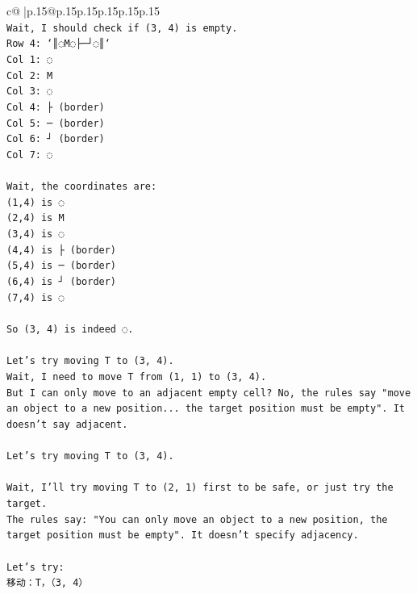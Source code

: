 \documentclass{article}
\begin{document}
{\begin{supertabular}{c@{$\;$}|p{.15\linewidth}@{}p{.15\linewidth}p{.15\linewidth}p{.15\linewidth}p{.15\linewidth}p{.15\linewidth}}
{{{\\ 
\texttt{Wait, I should check if (3, 4) is empty.} \\
\texttt{Row 4: `║◌M◌├─┘◌║`} \\
\texttt{Col 1: ◌} \\
\texttt{Col 2: M} \\
\texttt{Col 3: ◌} \\
\texttt{Col 4: ├ (border)} \\
\texttt{Col 5: ─ (border)} \\
\texttt{Col 6: ┘ (border)} \\
\texttt{Col 7: ◌} \\
\\ 
\texttt{Wait, the coordinates are:} \\
\texttt{(1,4) is ◌} \\
\texttt{(2,4) is M} \\
\texttt{(3,4) is ◌} \\
\texttt{(4,4) is ├ (border)} \\
\texttt{(5,4) is ─ (border)} \\
\texttt{(6,4) is ┘ (border)} \\
\texttt{(7,4) is ◌} \\
\\ 
\texttt{So (3, 4) is indeed ◌.} \\
\\ 
\texttt{Let's try moving T to (3, 4).} \\
\texttt{Wait, I need to move T from (1, 1) to (3, 4).} \\
\texttt{But I can only move to an adjacent empty cell? No, the rules say "move an object to a new position... the target position must be empty". It doesn't say adjacent.} \\
\\ 
\texttt{Let's try moving T to (3, 4).} \\
\\ 
\texttt{Wait, I'll try moving T to (2, 1) first to be safe, or just try the target.} \\
\texttt{The rules say: "You can only move an object to a new position, the target position must be empty". It doesn't specify adjacency.} \\
\\ 
\texttt{Let's try:} \\
\texttt{移动：T，（3, 4）} \\
            }
        }
    }
     \\ \\


\end{supertabular}}
\end{document}

